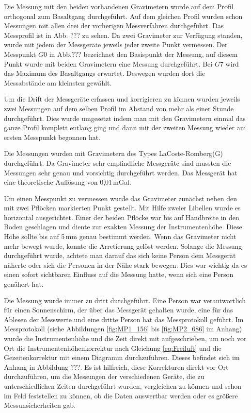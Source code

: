 Die Messung mit den beiden vorhandenen Gravimetern wurde auf dem Profil orthogonal zum Basaltgang durchgeführt. Auf dem gleichen Profil wurden schon Messungen mit allen drei der vorherigen Messverfahren durchgeführt.
Das Messprofil ist in Abb. ??? zu sehen. Da zwei Gravimeter zur Verfügung standen, wurde mit jedem der Messgeräte jeweils jeder zweite Punkt vermessen. Der Messpunkt $G0$ in Abb.??? bezeichnet den Basispunkt der Messung, auf
diesem Punkt wurde mit beiden Gravimetern eine Messung durchgeführt. Bei $G7$ wird das Maximum des Basaltgangs erwartet. Deswegen wurden dort die Messabstände am kleinsten gewählt.

Um die Drift der Messgeräte erfassen und korrigieren zu können wurden jeweils zwei Messungen auf dem selben Profil im Abstand von mehr als einer Stunde durchgeführt. Dies wurde umgesetzt indem man mit den Gravimetern 
einmal das ganze Profil komplett entlang ging und dann mit der zweiten Messung wieder am ersten Messpunkt begonnen hat.

Die Messungen wurden mit Gravimetern des Types LaCoste-Romberg(G) durchgeführt. Da Gravimeter sehr empfindliche Messgeräte sind mussten die Messungen sehr genau und vorsichtig durchgeführt werden. Das Messgerät hat eine 
theoretische Auflösung von 0,01\,mGal.

Um einen Messpunkt zu vermessen wurde das Gravimeter zunächst neben den mit zwei Pflöcken markierten Punkt gestellt. Mit Hilfe zweier Libellen wurde es horizontal ausgerichtet. Einer der beiden Pflöcke 
war bis auf Handbreite in den Boden geschlagen und diente zur exakten Messung der Instrumentenhöhe. Diese Höhe sollte bis auf 5\,mm genau bestimmt werden.
Wenn das Gravimeter nicht mehr bewegt wurde, konnte die Arretierung gelöst werden. Solange die Messung durchgeführt wurde, achtete man darauf das sich keine Person dem Messgerät näherte oder sich die Personen in der 
Nähe stark bewegen. Dies war wichtig da es einen sofort sichtbaren Einfluss auf die Messung hatte, wenn sich eine Person genähert hat.

Die Messung wurde immer zu dritt durchgeführt. Eine Person war verantwortlich für einen Sonnenschirm, der über das Messgerät gehalten wurde, eine für das Ablesen der Messwerte 
und eine dritte Person hat das Messprotokoll geführt. Im Messprotokoll (siehe Abbildungen \ref{fig:MP1_156} bis \ref{fig:MP2_686} im Anhang) wurde die Instrumentenhöhe und die Zeit direkt mit aufgeschrieben, um noch vor Ort die Instrumentenhöhenkorrektur nach Gleichung \eqref{eq:Freiluft} und die Gezeitenkorrektur mit einem Diagramm durchzuführen. Dieses befindet sich im Anhang in Abbildung ???. Es ist hilfreich, diese Korrekturen direkt vor Ort durchzuführen, um die Messungen der verschiedenen Geräte, die zu unterschiedlichen Zeiten durchgeführt wurden, vergleichen zu können und schon im Feld feststellen zu können, ob die Daten auswertbar werden oder es größere Messunsicherheiten gab.

